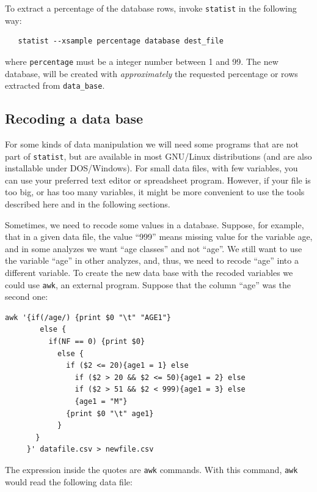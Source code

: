 \documentclass[12pt,english]{article}
\newcommand{\st}{{\tt sta\-tist} }
\begin{document}
To extract a percentage of the database rows, invoke \st in
the following way:

\begin{verbatim}
   statist --xsample percentage database dest_file
\end{verbatim}

\noindent where {\tt percentage} must be a integer number
between 1 and 99. The new database, will be
created with {\em approximately} the requested percentage or
rows extracted from {\tt data\_base}.

\subsection{Recoding a data base}

For some kinds of data manipulation we will need some
programs that are not part of {\tt sta\-tist}, but are
available in most GNU/\-Linux distributions (and are also
installable under DOS/\-Win\-dows). For small data files, with
few variables, you can use your preferred text editor or
spreadsheet program. However, if your file is too big, or
has too many variables, it might be more convenient to use
the tools described here and in the following sections.

Sometimes, we need to recode some values in a database.
Suppose, for example, that in a given data file, the value
``999'' means missing value for the variable age, and in
some analyzes we want ``age classes'' and not ``age''.  We
still want to use the variable ``age'' in other analyzes,
and, thus, we need to recode ``age'' into a different
variable. To create the new data base with the recoded
variables we could use {\tt awk}, an external program.
Suppose that the column ``age'' was the second one:

\begin{verbatim}
awk '{if(/age/) {print $0 "\t" "AGE1"}
        else {
          if(NF == 0) {print $0}
            else {
              if ($2 <= 20){age1 = 1} else
                if ($2 > 20 && $2 <= 50){age1 = 2} else
                if ($2 > 51 && $2 < 999){age1 = 3} else
                {age1 = "M"}
              {print $0 "\t" age1}
            }
       }
     }' datafile.csv > newfile.csv
\end{verbatim}


The expression inside the quotes are {\tt awk} commands.
With this command, {\tt awk} would read the following data
file:
\end{document}

